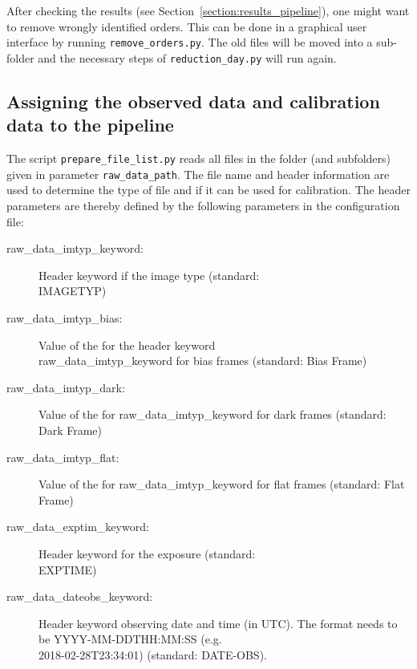 \documentclass[10pt,a4paper]{article}
\begin{document}
After checking the results (see Section~\ref{section:results_pipeline}), one might want to remove wrongly identified orders. This can be done in a graphical user interface by running \verb|remove_orders.py|. The old files will be moved into a sub-folder and the necessary steps of \verb|reduction_day.py| will run again.

\subsection{Assigning the observed data and calibration data to the pipeline}
\label{Section:prepare_files}

The script \verb|prepare_file_list.py| reads all files in the folder (and subfolders) given in parameter \verb|raw_data_path|. The file name and header information are used to determine the type of file and if it can be used for calibration. The header parameters are thereby defined by the following parameters in the configuration file:

\begin{description}
  \item[raw\_data\_imtyp\_keyword:] Header keyword if the image type (standard: \\ \mbox{IMAGETYP})
  \item[raw\_data\_imtyp\_bias:] Value of the for the header keyword \\ raw\_data\_imtyp\_keyword for bias frames (standard: Bias Frame)
  \item[raw\_data\_imtyp\_dark:] Value of the for raw\_data\_imtyp\_keyword for dark frames (standard: Dark Frame)
  \item[raw\_data\_imtyp\_flat:] Value of the for raw\_data\_imtyp\_keyword for flat frames (standard: Flat Frame)
  \item[raw\_data\_exptim\_keyword:] Header keyword for the exposure (standard: \\ \mbox{EXPTIME})
  \item[raw\_data\_dateobs\_keyword:] Header keyword observing date and time (in UTC). The format needs to be \mbox{YYYY-MM-DDTHH:MM:SS} (e.g. \\ \mbox{2018-02-28T23:34:01})  (standard: \mbox{DATE-OBS}).
\end{description}
\end{document}
